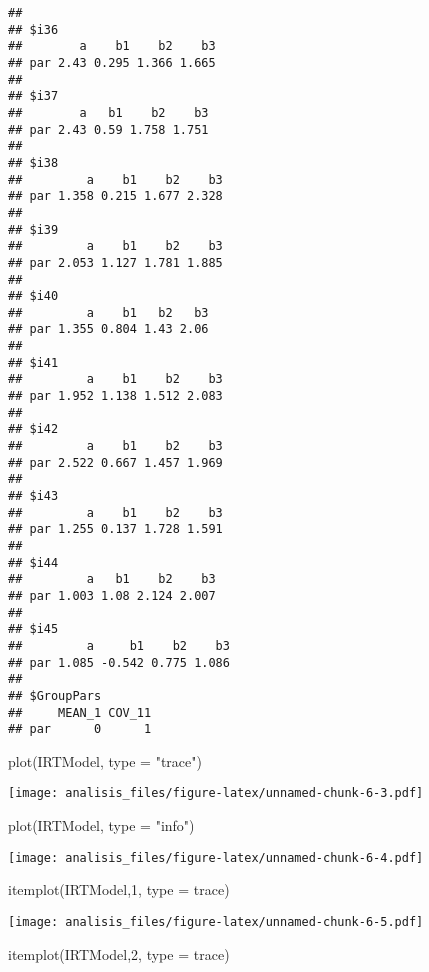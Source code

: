 \documentclass[
]{article}
\newenvironment{Shaded}{\begin{snugshade}}{\end{snugshade}}
\newcommand{\AttributeTok}[1]{\textcolor[rgb]{0.77,0.63,0.00}{#1}}
\newcommand{\DecValTok}[1]{\textcolor[rgb]{0.00,0.00,0.81}{#1}}
\newcommand{\FunctionTok}[1]{\textcolor[rgb]{0.00,0.00,0.00}{#1}}
\newcommand{\NormalTok}[1]{#1}
\newcommand{\StringTok}[1]{\textcolor[rgb]{0.31,0.60,0.02}{#1}}
\begin{document}
\begin{verbatim}
## 
## $i36
##        a    b1    b2    b3
## par 2.43 0.295 1.366 1.665
## 
## $i37
##        a   b1    b2    b3
## par 2.43 0.59 1.758 1.751
## 
## $i38
##         a    b1    b2    b3
## par 1.358 0.215 1.677 2.328
## 
## $i39
##         a    b1    b2    b3
## par 2.053 1.127 1.781 1.885
## 
## $i40
##         a    b1   b2   b3
## par 1.355 0.804 1.43 2.06
## 
## $i41
##         a    b1    b2    b3
## par 1.952 1.138 1.512 2.083
## 
## $i42
##         a    b1    b2    b3
## par 2.522 0.667 1.457 1.969
## 
## $i43
##         a    b1    b2    b3
## par 1.255 0.137 1.728 1.591
## 
## $i44
##         a   b1    b2    b3
## par 1.003 1.08 2.124 2.007
## 
## $i45
##         a     b1    b2    b3
## par 1.085 -0.542 0.775 1.086
## 
## $GroupPars
##     MEAN_1 COV_11
## par      0      1
\end{verbatim}

\begin{Shaded}
\begin{Highlighting}[]
\FunctionTok{plot}\NormalTok{(IRTModel,  }\AttributeTok{type =} \StringTok{"trace"}\NormalTok{)}
\end{Highlighting}
\end{Shaded}

\texttt{[image: analisis\_files/figure-latex/unnamed-chunk-6-3.pdf]}

\begin{Shaded}
\begin{Highlighting}[]
\FunctionTok{plot}\NormalTok{(IRTModel,  }\AttributeTok{type =} \StringTok{"info"}\NormalTok{)}
\end{Highlighting}
\end{Shaded}

\texttt{[image: analisis\_files/figure-latex/unnamed-chunk-6-4.pdf]}

\begin{Shaded}
\begin{Highlighting}[]
\FunctionTok{itemplot}\NormalTok{(IRTModel,}\DecValTok{1}\NormalTok{, }\AttributeTok{type =} \StringTok{\textquotesingle{}trace\textquotesingle{}}\NormalTok{)}
\end{Highlighting}
\end{Shaded}

\texttt{[image: analisis\_files/figure-latex/unnamed-chunk-6-5.pdf]}

\begin{Shaded}
\begin{Highlighting}[]
\FunctionTok{itemplot}\NormalTok{(IRTModel,}\DecValTok{2}\NormalTok{, }\AttributeTok{type =} \StringTok{\textquotesingle{}trace\textquotesingle{}}\NormalTok{)}
\end{Highlighting}
\end{Shaded}
\end{document}
